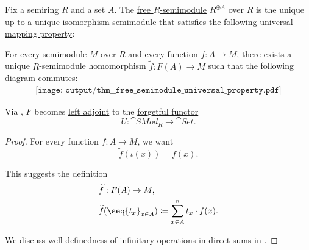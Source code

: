 \begin{proposition}\label{thm:free_semimodule_universal_property}
  Fix a semiring \( R \) and a set \( A \). The \hyperref[def:free_semimodule]{free \( R \)-semimodule} \( R^{\oplus A} \) over \( R \) is the unique up to a unique isomorphism semimodule that satisfies the following \hyperref[rem:universal_mapping_property]{universal mapping property}:
  \begin{displayquote}
    For every semimodule \( M \) over \( R \) and every function \( f: A \to M \), there exists a unique \( R \)-semimodule homomorphism \( \widetilde{f}: F(A) \to M \) such that the following diagram commutes:
    \begin{equation}\label{eq:thm:free_semimodule_universal_property/diagram}
      \begin{aligned}
        \texttt{[image: output/thm\_\_free\_semimodule\_universal\_property.pdf]}
      \end{aligned}
    \end{equation}
  \end{displayquote}

  Via , \( F \) becomes \hyperref[def:category_adjunction]{left adjoint} to the \hyperref[def:concrete_category]{forgetful functor}
  \begin{equation*}
    U: \cat{SMod}_R \to \cat{Set}.
  \end{equation*}
\end{proposition}
\begin{proof}
  For every function \( f: A \to M \), we want
  \begin{equation*}
    \widetilde{f}(\iota(x)) = f(x).
  \end{equation*}

  This suggests the definition
  \begin{equation*}
    \begin{aligned}
      &\widetilde{f}: F(A) \to M, \\
      &\widetilde{f}(\seq{ t_x }_{x \in A}) \coloneqq \sum_{x \in A}^n t_x \cdot f(x).
    \end{aligned}
  \end{equation*}

  We discuss well-definedness of infinitary operations in direct sums in .
\end{proof}

